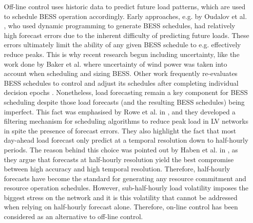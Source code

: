 Off-line control uses historic data to predict future load patterns, which are used to schedule BESS operation accordingly.
Early approaches, e.g. by Oudalov et al. \cite{Oudalov2007}, who used dynamic programming to generate BESS schedules, had relatively high forecast errors due to the inherent difficulty of predicting future loads.
These errors ultimately limit the ability of any given BESS schedule to e.g. effectively reduce peaks.
This is why recent research begun including uncertainty, like the work done by Baker et al. \cite{Baker2017} where uncertainty of wind power was taken into account when scheduling and sizing BESS.
Other work frequently re-evaluates BESS schedules to control and adjust its schedules after completing individual decision epochs \cite{Wang2014a}.
Nonetheless, load forecasting remain a key component for BESS scheduling despite those load forecasts (and the resulting BESS schedules) being imperfect.
This fact was emphasised by Rowe et al. in \cite{Rowe2014a}, and they developed a filtering mechanism for scheduling algorithms to reduce peak load in LV networks in spite the presence of forecast errors.
They also highlight the fact that most day-ahead load forecast only predict at a temporal resolution down to half-hourly periods.
The reason behind this choice was pointed out by Haben et al. in \cite{Poghosyan2014, Haben2014}, as they argue that forecasts at half-hourly resolution yield the best compromise between high accuracy and high temporal resolution.
Therefore, half-hourly forecasts have become the standard for generating any resource commitment and resource operation schedules.
However, sub-half-hourly load volatility imposes the biggest stress on the network and it is this volatility that cannot be addressed when relying on half-hourly forecast alone.
Therefore, on-line control has been considered as an alternative to off-line control.

